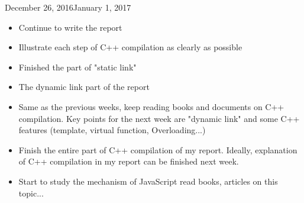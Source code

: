 \begin{fichesuivi}{December 26, 2016}{January 1, 2017}

   \begin{travaileffectue}
        \begin{itemize}
            \item Continue to write the report
            \item Illustrate each step of C++ compilation as clearly as possible
            \item Finished the part of "static link"
        \end{itemize}
   \end{travaileffectue}

   \begin{travailnoneffectue}
        \begin{itemize}
             \item The dynamic link part of the report 
        \end{itemize}
   \end{travailnoneffectue}

 
   \begin{planification}
        \begin{itemize}
            \item Same as the previous weeks, keep reading books and documents on C++ compilation.
Key points for the next week are "dynamic link" and some C++ features (template, virtual function, Overloading...)
            \item Finish the entire part of C++ compilation of my report. Ideally, explanation of C++ compilation in my report can be finished next week.
            \item Start to study the mechanism of JavaScript read books, articles on this topic...
        \end{itemize}
   \end{planification}
\end{fichesuivi}






